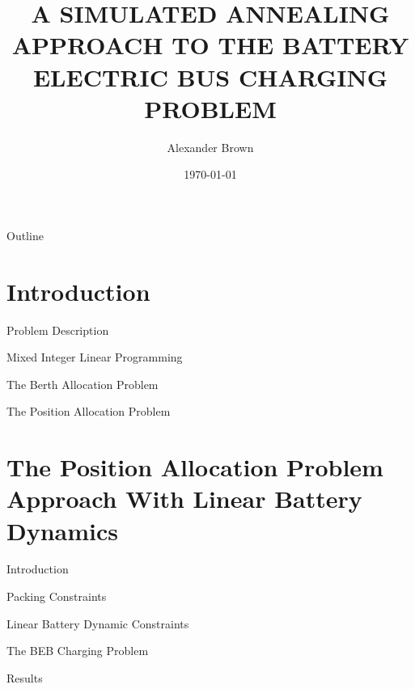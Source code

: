\documentclass[bigger]{beamer}
\author{Alexander Brown}
\date{\today}
\title{A SIMULATED ANNEALING APPROACH TO THE BATTERY ELECTRIC BUS CHARGING PROBLEM}
\begin{document}
\maketitle
\begin{frame}{Outline}
\tableofcontents
\end{frame}


\section{Introduction}
\label{sec:orgc729397}
\begin{frame}[label={sec:org22f76e8}]{Problem Description}
\end{frame}
\begin{frame}[label={sec:org4930233}]{Mixed Integer Linear Programming}
\end{frame}
\begin{frame}[label={sec:org4418fd2}]{The Berth Allocation Problem}
\end{frame}
\begin{frame}[label={sec:org2272474}]{The Position Allocation Problem}
\end{frame}
\section{The Position Allocation Problem Approach With Linear Battery Dynamics}
\label{sec:orgaedbfc8}
\begin{frame}[label={sec:org2ad8a7a}]{Introduction}
\end{frame}
\begin{frame}[label={sec:org9cdd227}]{Packing Constraints}
\end{frame}
\begin{frame}[label={sec:orga9d0b90}]{Linear Battery Dynamic Constraints}
\end{frame}
\begin{frame}[label={sec:org5d9ca19}]{The BEB Charging Problem}
\end{frame}
\begin{frame}[label={sec:org82fbdab}]{Results}
\end{frame}
\end{document}
